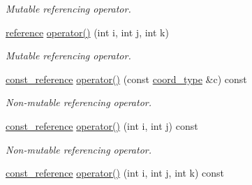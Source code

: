 \begin{DoxyCompactItemize}
\begin{DoxyCompactList}\small\item\em Mutable referencing operator. \end{DoxyCompactList}\item 
\hypertarget{class_d_o_1_1_multi_array_a39b2df46d5f4fc6ab3f6311e21bbf184}{\hyperlink{class_d_o_1_1_multi_array_a9b1a63f171d76a7a3995b6858e99f2ea}{reference} \hyperlink{class_d_o_1_1_multi_array_a39b2df46d5f4fc6ab3f6311e21bbf184}{operator()} (int i, int j, int k)}\label{class_d_o_1_1_multi_array_a39b2df46d5f4fc6ab3f6311e21bbf184}

\begin{DoxyCompactList}\small\item\em Mutable referencing operator. \end{DoxyCompactList}\item 
\hypertarget{class_d_o_1_1_multi_array_ab77af7f5f264a0e64251a90a300ec8f9}{\hyperlink{class_d_o_1_1_multi_array_af9ba3e25df088c62f7d535b91672cda9}{const\-\_\-reference} \hyperlink{class_d_o_1_1_multi_array_ab77af7f5f264a0e64251a90a300ec8f9}{operator()} (const \hyperlink{class_d_o_1_1_multi_array_ae4fb477425bbeb20329d300396ac2582}{coord\-\_\-type} \&c) const }\label{class_d_o_1_1_multi_array_ab77af7f5f264a0e64251a90a300ec8f9}

\begin{DoxyCompactList}\small\item\em Non-\/mutable referencing operator. \end{DoxyCompactList}\item 
\hypertarget{class_d_o_1_1_multi_array_a775d64bc033de30a55882546aa444731}{\hyperlink{class_d_o_1_1_multi_array_af9ba3e25df088c62f7d535b91672cda9}{const\-\_\-reference} \hyperlink{class_d_o_1_1_multi_array_a775d64bc033de30a55882546aa444731}{operator()} (int i, int j) const }\label{class_d_o_1_1_multi_array_a775d64bc033de30a55882546aa444731}

\begin{DoxyCompactList}\small\item\em Non-\/mutable referencing operator. \end{DoxyCompactList}\item 
\hypertarget{class_d_o_1_1_multi_array_a5f265fc9984db753cbe10b36e438a741}{\hyperlink{class_d_o_1_1_multi_array_af9ba3e25df088c62f7d535b91672cda9}{const\-\_\-reference} \hyperlink{class_d_o_1_1_multi_array_a5f265fc9984db753cbe10b36e438a741}{operator()} (int i, int j, int k) const }\label{class_d_o_1_1_multi_array_a5f265fc9984db753cbe10b36e438a741}


\end{DoxyCompactItemize}
